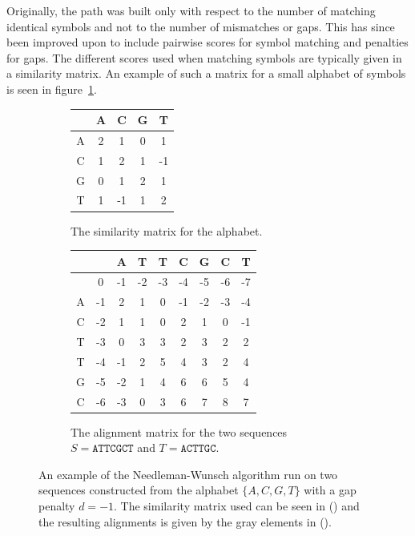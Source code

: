 \documentclass[a4paper]{report}
\begin{document}
Originally, the path was built only with respect to the number of matching
identical symbols and not to the number of mismatches or gaps. This has since
been improved upon to include pairwise scores for symbol matching and penalties
for gaps. The different scores used when matching symbols are typically given in
a similarity matrix. An example of such a matrix for a small alphabet of
symbols is seen in figure~\ref{fig:simmatrix}.

\begin{figure}[t]
    \centering
    \begin{subfigure}[b]{0.3\textwidth}
        \begin{tabular}{| c | c | c | c | c |}
            \hline
              &  A &  C & G &  T \\ \hline
            A &  2 &  1 & 0 &  1 \\ \hline
            C &  1 &  2 & 1 & -1 \\ \hline
            G &  0 &  1 & 2 &  1 \\ \hline
            T &  1 & -1 & 1 &  2 \\ \hline
        \end{tabular}
        \caption{The similarity matrix for the alphabet.}
        \label{fig:simmatrix}
    \end{subfigure}
    \quad
    \begin{subfigure}[b]{0.55\textwidth}
        \begin{tabular}{| c | c | c | c | c | c | c | c | c |}
            \hline
            & & A & T & T & C & G & C & T \\ \hline
            &\cellcolor[gray]{0.9}0 & -1 & -2 & -3 & -4 & -5 & -6 & -7 \\
            \hline
            A & -1 &\cellcolor[gray]{0.9}2 & 1 & 0 & -1 & -2 & -3 & -4 \\
            \hline
            C & -2 &\cellcolor[gray]{0.9}1 & 1 & 0 & 2 & 1 & 0 & -1 \\ \hline
            T & -3 & 0 &\cellcolor[gray]{0.9}3 & 3 & 2 & 3 & 2 & 2 \\ \hline
            T & -4 & -1 & 2 &\cellcolor[gray]{0.9}5 &\cellcolor[gray]{0.9}4 & 3
            & 2 & 4 \\ \hline
            G & -5 & -2 & 1 & 4 & 6 &\cellcolor[gray]{0.9}6 & 5 & 4 \\ \hline
            C & -6 & -3 & 0 & 3 & 6 & 7 &\cellcolor[gray]{0.9}8 &
            \cellcolor[gray]{0.9}7 \\ \hline
        \end{tabular}
        \caption{The alignment matrix for the two sequences
            $S = \texttt{ATTCGCT}$ and $T = \texttt{ACTTGC}$.}
        \label{fig:nwmatrix}
    \end{subfigure}
    \caption{An example of the Needleman-Wunsch algorithm run on two sequences
    constructed from the alphabet $\{A, C, G, T\}$ with a gap penalty $d = -1$.
    The similarity matrix used can be seen in () and the
    resulting alignments is given by the gray elements in
    ().}
    \label{fig:nwtables}
\end{figure}
\end{document}
